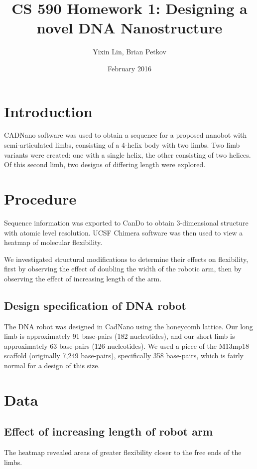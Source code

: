 \documentclass{article}
\title{CS 590 Homework 1: Designing a novel DNA Nanostructure}
\author{Yixin Lin, Brian Petkov }
\date{February 2016}
\begin{document}
\maketitle

\section{Introduction}

CADNano software was used to obtain a sequence for a proposed nanobot with semi-articulated limbs, consisting of a 4-helix body with two limbs. Two limb variants were created: one with a single helix, the other consisting of two helices. Of this second limb, two designs of differing length were explored.

\section{Procedure}

Sequence information was exported to CanDo to obtain 3-dimensional structure with atomic level resolution. UCSF Chimera software was then used to view a heatmap of molecular flexibility.

We investigated structural modifications to determine their effects on flexibility, first by observing the effect of doubling the width of the robotic arm, then by observing the effect of increasing length of the arm.

\subsection{Design specification of DNA robot}

The DNA robot was designed in CadNano using the honeycomb lattice. Our long limb is approximately 91 base-pairs (182 nucleotides), and our short limb is approximately 63 base-pairs (126 nucleotides). We used a piece of the M13mp18 scaffold (originally 7,249 base-pairs), specifically 358 base-pairs, which is fairly normal for a design of this size.


\section{Data}


\subsection{Effect of increasing length of robot arm}
\textit{}
The heatmap revealed areas of greater flexibility closer to the free ends of the limbs.
\end{document}
